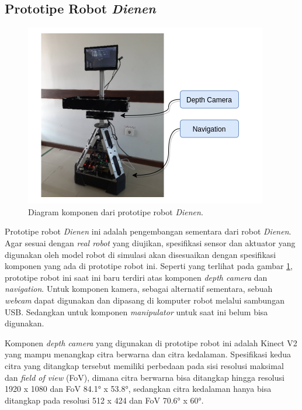 \subsection{Prototipe Robot \emph{Dienen}}
\label{subsec:prototiperobotdienen}

\begin{figure}[ht]
  \centering
  \includegraphics[scale=0.5]{gambar/komponen-prototipe-robot.png}
  \caption{Diagram komponen dari prototipe robot \emph{Dienen}.}
  \label{fig:komponenprototiperobot}
\end{figure}

Prototipe robot \emph{Dienen} ini adalah pengembangan sementara dari robot \emph{Dienen}.
Agar sesuai dengan \emph{real robot} yang diujikan,
  spesifikasi sensor dan aktuator yang digunakan oleh model robot di simulasi akan disesuaikan dengan spesifikasi komponen yang ada di prototipe robot ini.
Seperti yang terlihat pada gambar \ref{fig:komponenprototiperobot},
  prototipe robot ini saat ini baru terdiri atas komponen \emph{depth camera} dan \emph{navigation}.
Untuk komponen kamera, sebagai alternatif sementara, sebuah \emph{webcam} dapat digunakan dan dipasang di komputer robot melalui sambungan USB.
Sedangkan untuk komponen \emph{manipulator} untuk saat ini belum bisa digunakan.

Komponen \emph{depth camera} yang digunakan di prototipe robot ini adalah Kinect V2 yang mampu menangkap citra berwarna dan citra kedalaman.
Spesifikasi kedua citra yang ditangkap tersebut memiliki perbedaan pada sisi resolusi maksimal dan \emph{field of view} (FoV),
  dimana citra berwarna bisa ditangkap hingga resolusi 1920 x 1080 dan FoV 84.1° x 53.8°,
  sedangkan citra kedalaman hanya bisa ditangkap pada resolusi 512 x 424 dan FoV 70.6° x 60°.

